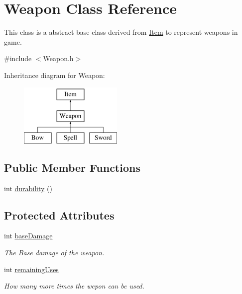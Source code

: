 \hypertarget{classWeapon}{\section{Weapon Class Reference}
\label{classWeapon}
}


This class is a abstract base class derived from \hyperlink{classItem}{Item} to represent weapons in game.  




{\ttfamily \#include $<$Weapon.\-h$>$}

Inheritance diagram for Weapon\-:\begin{figure}[H]
\begin{center}
\leavevmode
\includegraphics[height=3.000000cm]{classWeapon}
\end{center}
\end{figure}
\subsection*{Public Member Functions}
\begin{DoxyCompactItemize}
\item 
int \hyperlink{classWeapon_ab66a42df24e121bf9499f473a42ca325}{durability} ()
\end{DoxyCompactItemize}
\subsection*{Protected Attributes}
\begin{DoxyCompactItemize}
\item 
\hypertarget{classWeapon_a507937307f9f92fc29b4b6827d85585a}{int \hyperlink{classWeapon_a507937307f9f92fc29b4b6827d85585a}{base\-Damage}}\label{classWeapon_a507937307f9f92fc29b4b6827d85585a}

\begin{DoxyCompactList}\small\item\em The Base damage of the weapon. \end{DoxyCompactList}\item 
\hypertarget{classWeapon_abbc826be5477aa791910f871d76a1da2}{int \hyperlink{classWeapon_abbc826be5477aa791910f871d76a1da2}{remaining\-Uses}}\label{classWeapon_abbc826be5477aa791910f871d76a1da2}

\begin{DoxyCompactList}\small\item\em How many more times the wepon can be used. \end{DoxyCompactList}\end{DoxyCompactItemize}


